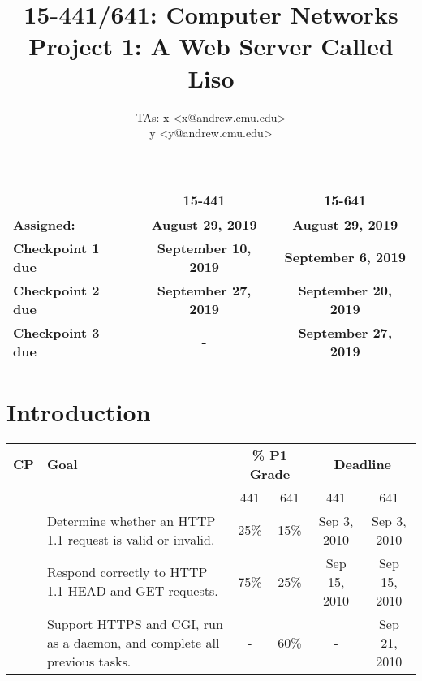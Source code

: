 \documentclass{article}
\begin{document}
\title{	15-441/641: Computer Networks\\
Project 1: A Web Server Called Liso\\
}

\author{TAs: x <x@andrew.cmu.edu> \\
y <y@andrew.cmu.edu>}
\date{}

\maketitle

\begin{center}
\begin{tabular}{lcc}
  &  \textbf{15-441}&  \textbf{15-641} \\

  \hline
  
  \addlinespace[5pt]
\textbf{Assigned:} &  \textbf{August 29, 2019}  &  \textbf{August 29, 2019}  \\

  \addlinespace[5pt]
\textbf{Checkpoint 1 due} & \textbf{September 10, 2019} & \textbf{September 6, 2019} \\
  
  \addlinespace[5pt]
\textbf{Checkpoint 2 due} & \textbf{September 27, 2019} & \textbf{September 20, 2019} \\

  \addlinespace[5pt]
\textbf{Checkpoint 3 due} & \textbf{-} & \textbf{September 27, 2019} \\

\end{tabular}
\end{center}



\section{Introduction}


\begin{center}
\vspace{10pt}
\begin{tabular}{cp{2.5in}cccc}
  {\bf CP}&{\bf Goal}&\multicolumn{2}{c}{{\bf \% P1 Grade}}&\multicolumn{2}{c}{{\bf Deadline}}\\
  & & 441 & 641 & 441 & 641 \\

  \hline
  
  \addlinespace[5pt]
  1&Determine whether an HTTP 1.1 request is valid or invalid. & 25\% & 15\% & Sep 3, 2010 & Sep 3, 2010 \\
  
  \addlinespace[5pt]
  2&Respond correctly to HTTP 1.1 HEAD and GET requests. & 75\% & 25\% & Sep 15, 2010 & Sep 15, 2010   \\
  
  \addlinespace[5pt]
  3&Support HTTPS and CGI, run as a daemon, and complete all previous tasks. & - & 60\% & - & Sep 21, 2010\\
\end{tabular}
\end{center}
\end{document}
